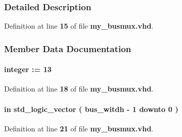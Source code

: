 \subsubsection{Detailed Description}


Definition at line {\bf 15} of file {\bf my\+\_\+busmux.\+vhd}.



\subsubsection{Member Data Documentation}
\paragraph[{bus\+\_\+witdh}]{ {\bfseries \textcolor{vhdlchar}{ }} {\bfseries \textcolor{comment}{integer}\textcolor{vhdlchar}{ }\textcolor{vhdlchar}{ }\textcolor{vhdlchar}{\+:}\textcolor{vhdlchar}{=}\textcolor{vhdlchar}{ }\textcolor{vhdlchar}{ } \textcolor{vhdldigit}{13} \textcolor{vhdlchar}{ }} \hspace{0.3cm}{\ttfamily [Generic]}}\label{classmy__busmux_a91cb0aa6f31c47856c3c35c31233cbb1}


Definition at line {\bf 18} of file {\bf my\+\_\+busmux.\+vhd}.

\paragraph[{dataa}]{ {\bfseries \textcolor{keywordflow}{in}\textcolor{vhdlchar}{ }} {\bfseries \textcolor{comment}{std\+\_\+logic\+\_\+vector}\textcolor{vhdlchar}{ }\textcolor{vhdlchar}{(}\textcolor{vhdlchar}{ }\textcolor{vhdlchar}{ }\textcolor{vhdlchar}{ }\textcolor{vhdlchar}{ }{\bfseries {\bf bus\+\_\+witdh}} \textcolor{vhdlchar}{-\/}\textcolor{vhdlchar}{ } \textcolor{vhdldigit}{1} \textcolor{vhdlchar}{ }\textcolor{keywordflow}{downto}\textcolor{vhdlchar}{ }\textcolor{vhdlchar}{ } \textcolor{vhdldigit}{0} \textcolor{vhdlchar}{ }\textcolor{vhdlchar}{)}\textcolor{vhdlchar}{ }} \hspace{0.3cm}{\ttfamily [Port]}}\label{classmy__busmux_afbb10a51fd1ad11329fd5cb8af36c3af}


Definition at line {\bf 21} of file {\bf my\+\_\+busmux.\+vhd}.

